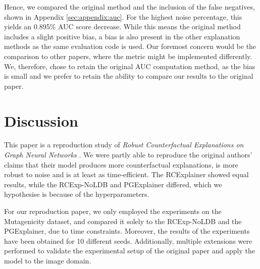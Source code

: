 Hence, we compared the original method and the inclusion of the false negatives, shown in Appendix \ref{sec:appendix:auc}. For the highest noise percentage, this yields an 0.895\% AUC score decrease. While this means the original method includes a slight positive bias, a bias is also present in the other explanation methods as the same evaluation code is used. Our foremost concern would be the comparison to other papers, where the metric might be implemented differently. We, therefore,  chose to retain the original AUC computation method, as the bias is small and we prefer to retain the ability to compare our results to the original paper.


\section{Discussion} \label{sec:discussion}
This paper is a reproduction study of \textit{Robust Counterfactual Explanations on Graph Neural Networks} \cite{bajaj2021robust}. We were partly able to reproduce the original authors’ claims that their model produces more counterfactual explanations, is more robust to noise and is at least as time-efficient. The RCExplainer showed equal results, while the RCExp-NoLDB and PGExplainer differed, which we hypothesise is because of the hyperparameters.

For our reproduction paper, we only employed the experiments on the Mutagenicity dataset, and compared it solely to the RCExp-NoLDB and the PGExplainer, due to time constraints. Moreover, the results of the experiments have been obtained for 10 different seeds. Additionally, multiple extensions were performed to validate the experimental setup of the original paper and apply the model to the image domain.


